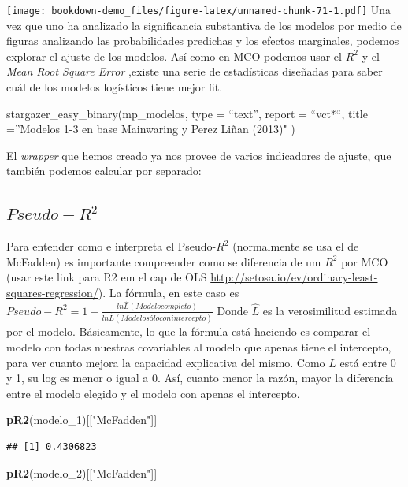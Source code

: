 \documentclass[]{book}
\newenvironment{Shaded}{\begin{snugshade}}{\end{snugshade}}
\newcommand{\KeywordTok}[1]{\textcolor[rgb]{0.13,0.29,0.53}{\textbf{#1}}}
\newcommand{\DecValTok}[1]{\textcolor[rgb]{0.00,0.00,0.81}{#1}}
\newcommand{\StringTok}[1]{\textcolor[rgb]{0.31,0.60,0.02}{#1}}
\newcommand{\NormalTok}[1]{#1}
\begin{document}
\texttt{[image: bookdown-demo\_files/figure-latex/unnamed-chunk-71-1.pdf]}
Una vez que uno ha analizado la significancia substantiva de los modelos
por medio de figuras analizando las probabilidades predichas y los
efectos marginales, podemos explorar el ajuste de los modelos. Así como
en MCO podemos usar el \(R^2\) y el \emph{Mean Root Square Error}
,existe una serie de estadísticas diseñadas para saber cuál de los
modelos logísticos tiene mejor fit.

stargazer\_easy\_binary(mp\_modelos, type = ``text'', report = ``vct*``,
title =''Modelos 1-3 en base Mainwaring y Perez Liñan (2013)" )

El \emph{wrapper} que hemos creado ya nos provee de varios indicadores
de ajuste, que también podemos calcular por separado:

\subsection{\texorpdfstring{\(Pseudo-R^2\)}{Pseudo-R\^{}2}}\label{pseudo-r2}

Para entender como e interpreta el Pseudo-\(R^2\) (normalmente se usa el
de McFadden) es importante compreender como se diferencia de um \(R^2\)
por MCO (usar este link para R2 em el cap de OLS
\url{http://setosa.io/ev/ordinary-least-squares-regression/}). La
fórmula, en este caso es
\(Pseudo-R^2= 1-\frac {ln \hat{L}(Modelo completo)}{ln \hat{L}(Modelo sólo con intercepto)}\)
Donde \(\hat{L}\) es la verosimilitud estimada por el modelo.
Básicamente, lo que la fórmula está haciendo es comparar el modelo con
todas nuestras covariables al modelo que apenas tiene el intercepto,
para ver cuanto mejora la capacidad explicativa del mismo. Como \(L\)
está entre 0 y 1, su log es menor o igual a 0. Así, cuanto menor la
razón, mayor la diferencia entre el modelo elegido y el modelo con
apenas el intercepto.

\begin{Shaded}
\begin{Highlighting}[]
\KeywordTok{pR2}\NormalTok{(modelo_}\DecValTok{1}\NormalTok{)[[}\StringTok{"McFadden"}\NormalTok{]]}
\end{Highlighting}
\end{Shaded}

\begin{verbatim}
## [1] 0.4306823
\end{verbatim}

\begin{Shaded}
\begin{Highlighting}[]
\KeywordTok{pR2}\NormalTok{(modelo_}\DecValTok{2}\NormalTok{)[[}\StringTok{"McFadden"}\NormalTok{]]}
\end{Highlighting}
\end{Shaded}
\end{document}

